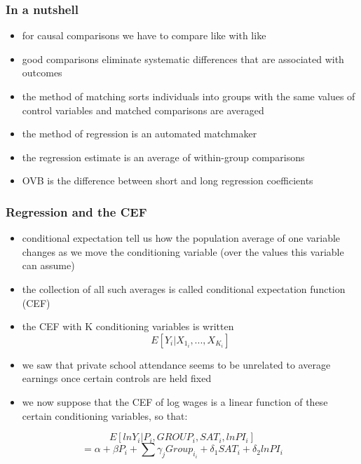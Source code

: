 \documentclass{beamer}
\begin{document}

\begin{frame}
\frametitle{In a nutshell}
	\begin{itemize}
		\item for causal comparisons we have to compare like with like
		\item good comparisons eliminate systematic differences that are associated with outcomes
		\item the method of matching sorts individuals into groups with the same values of control variables and matched comparisons are averaged
		\item the method of regression is an automated matchmaker
		\item the regression estimate is an average of within-group comparisons
		\item OVB is the difference between short and long regression coefficients
	\end{itemize}

\end{frame}

\begin{frame}
\frametitle{Regression and the CEF}
	\begin{itemize}
		\item conditional expectation tell us how the population average of one variable changes as we move the conditioning variable (over the values this variable can assume)
		\item the collection of all such averages is called conditional expectation function (CEF)
		\item the CEF with K conditioning variables is written $$E[Y_i|X_1_i,...,X_K_i]$$
		\item we saw that private school attendance seems to be unrelated to average earnings once certain controls are held fixed
		\item we now suppose that the CEF of log wages is a linear function of these certain conditioning variables, so that:
		\end{itemize}
		$$E[ln Y_i| P_i, GROUP_i, SAT_i, lnPI_i]$$
		$$= \alpha + \beta P_i + \sum{\gamma_j Group_i_i + \delta_1 SAT_i + \delta _ 2 ln PI_i}$$

\end{frame}
\end{document}
